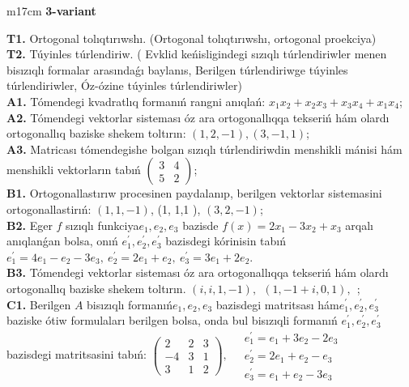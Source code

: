 \documentclass{article}
\begin{document}
\begin{tabular}{m{17cm}}
\textbf{3-variant}
\newline

\textbf{T1.} Ortogonal  tolıqtırıwshı. (Ortogonal tolıqtırıwshı,  ortogonal proekciya) \\
\textbf{T2.} Túyinles túrlendiriw. ( Evklid keńisligindegi sızıqlı túrlendiriwler menen bisızıqlı formalar arasındaǵı baylanıs, Berilgen túrlendiriwge túyinles túrlendiriwler, Óz-ózine túyinles túrlendiriwler) \\
\textbf{A1.} Tómendegi kvadratlıq formanıń rangni anıqlań: \(x_{1}x_{2} + x_{2}x_{3} + x_{3}x_{4} + x_{1}x_{4}\); \\
\textbf{A2.} Tómendegi vektorlar sisteması óz ara ortogonallıqqa tekseriń hám olardı ortogonallıq baziske shekem toltırın: \((1,2, - 1),(3, - 1,1)\); \\
\textbf{A3.} Matricası tómendegishe bolgan sızıqlı túrlendiriwdin menshikli mánisi hám menshikli vektorların tabıń \(\begin{pmatrix} 3 & 4 \\ 5 & 2 \end{pmatrix}\); \\
\textbf{B1.} Ortogonallastırıw procesinen paydalanıp, berilgen vektorlar sistemasini ortogonallastirıń: \((1,1, - 1)\), (1, 1,1 ), \((3,2, - 1)\); \\
\textbf{B2.} Eger \(f\) sızıqlı funkciya\(e_{1},e_{2},e_{3}\) bazisde \(f(x) = 2x_{1} - 3x_{2} + x_{3}\) arqalı anıqlanǵan bolsa, onıń \(e_{1}^{'},e_{2}^{'},e_{3}^{'}\) bazisdegi kórinisin tabıń\(e_{1}^{'} = 4e_{1} - e_{2} - 3e_{3},\ e_{2}^{'} = 2e_{1} + e_{2},\ e_{3}^{'} = 3e_{1} + 2e_{2}\). \\
\textbf{B3.} Tómendegi vektorlar sisteması óz ara ortogonallıqqa tekseriń hám olardı ortogonallıq baziske shekem toltırın. \((i,i,1, - 1),\ \ (1, - 1 + i,0,1),\ \ \); \\
\textbf{C1.} Berilgen \(A\) bisızıqlı formanıń\(e_{1},e_{2},e_{3}\) bazisdegi matritsası hám\(e_{1}^{'},e_{2}^{'},e_{3}^{'}\) baziske ótiw formulaları berilgen bolsa, onda bul bisızıqli formanıń \(e_{1}^{'},e_{2}^{'},e_{3}^{'}\) bazisdegi matritsasini tabıń: \(\begin{pmatrix} 2 & 2 & 3 \\  - 4 & 3 & 1 \\ 3 & 1 & 2 \end{pmatrix},\ \begin{matrix}  & e_{1}^{'} = e_{1} + 3e_{2} - 2e_{3} \\  & e_{2}^{'} = 2e_{1} + e_{2} - e_{3} \\  & e_{3}^{'} = e_{1} + e_{2} - 3e_{3} \end{matrix}\) \\

\end{tabular}
\end{document}
